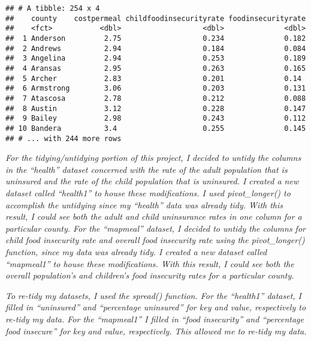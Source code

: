 \documentclass[]{article}
\newenvironment{Shaded}{\begin{snugshade}}{\end{snugshade}}
\newcommand{\CommentTok}[1]{\textcolor[rgb]{0.56,0.35,0.01}{\textit{#1}}}
\newcommand{\DataTypeTok}[1]{\textcolor[rgb]{0.13,0.29,0.53}{#1}}
\newcommand{\KeywordTok}[1]{\textcolor[rgb]{0.13,0.29,0.53}{\textbf{#1}}}
\newcommand{\NormalTok}[1]{#1}
\newcommand{\OperatorTok}[1]{\textcolor[rgb]{0.81,0.36,0.00}{\textbf{#1}}}
\newcommand{\StringTok}[1]{\textcolor[rgb]{0.31,0.60,0.02}{#1}}
\begin{document}
\begin{Shaded}
\end{Shaded}

\begin{verbatim}
## # A tibble: 254 x 4
##    county    costpermeal childfoodinsecurityrate foodinsecurityrate
##    <fct>           <dbl>                   <dbl>              <dbl>
##  1 Anderson         2.75                   0.234              0.182
##  2 Andrews          2.94                   0.184              0.084
##  3 Angelina         2.94                   0.253              0.189
##  4 Aransas          2.95                   0.263              0.165
##  5 Archer           2.83                   0.201              0.14 
##  6 Armstrong        3.06                   0.203              0.131
##  7 Atascosa         2.78                   0.212              0.088
##  8 Austin           3.12                   0.228              0.147
##  9 Bailey           2.98                   0.243              0.112
## 10 Bandera          3.4                    0.255              0.145
## # ... with 244 more rows
\end{verbatim}

\emph{For the tidying/untidying portion of this project, I decided to
untidy the columns in the ``health'' dataset concerned with the rate of
the adult population that is uninsured and the rate of the child
population that is uninsured. I created a new dataset called ``health1''
to house these modifications. I used pivot\_longer() to accomplish the
untidying since my ``health'' data was already tidy. With this result, I
could see both the adult and child uninsurance rates in one column for a
particular county. For the ``mapmeal'' dataset, I decided to untidy the
columns for child food insecurity rate and overall food insecurity rate
using the pivot\_longer() function, since my data was already tidy. I
created a new dataset called ``mapmeal1'' to house these modifications.
With this result, I could see both the overall population's and
children's food insecurity rates for a particular county.}

\emph{To re-tidy my datasets, I used the spread() function. For the
``health1'' dataset, I filled in ``uninsured'' and ``percentage
uninsured'' for key and value, respectively to re-tidy my data. For the
``mapmeal1'' I filled in ``food insecurity'' and ``percentage food
insecure'' for key and value, respectively. This allowed me to re-tidy
my data.}
\end{document}
